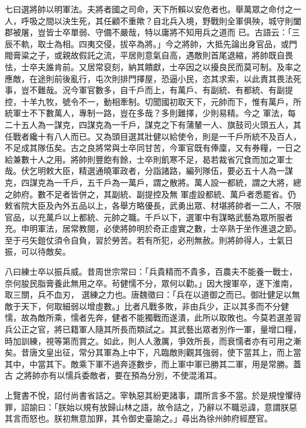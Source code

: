 \begin{pinyinscope}
 七曰選將帥以明軍法。夫將者國之司命，天下所賴以安危者也。舉萬眾之命付之一人，呼吸之間以決生死，其任顧不重歟？自北兵入境，野戰則全軍俱殃，城守則闔郡被屠，豈皆士卒單弱、守備不嚴哉，特以庸將不知用兵之道而
 已。古語云：「三辰不軌，取士為相。四夷交侵，拔卒為將。」今之將帥，大抵先論出身官品，或門閥膏粱之子，或親故假託之流，平居則意氣自高，遇敵則首尾退縮，將帥既自畏怯，士卒夫誰肯前。又居常裒刻，納其饋獻，士卒因之以擾良民而莫可制。及率之應敵，在途則前後亂行，屯次則排門擇屋，恐逼小民，恣其求索，以此責其畏法死事，豈不難哉。況今軍官數多，自千戶而上，有萬戶、有副統、有都統、有副提控，十羊九牧，號令不一，動相牽制。切聞國初取天下，元帥而下，惟有萬戶，所統軍士不下數萬人，專制一路，豈在多哉？多則難擇，少則易精。今之
 軍法，每二十五人為一謀克，四謀克為一千戶，謀克之下有蒲輦一人、旗鼓司火頭五人，其任戰者纔十有八人而已。又為頭目選其壯健以給使令，則是一千戶所統不及百人，不足成其隊伍矣。古之良將常與士卒同甘苦，今軍官既有俸廩，又有券糧，一日之給兼數十人之用。將帥則豐飽有餘，士卒則飢寒不足，曷若裁省冗食而加之軍士哉。伏乞明敕大臣，精選通曉軍政者，分詣諸路，編列隊伍，要必五十人為一謀克，四謀克為一千戶，五千戶為一萬戶，謂之散將。萬人設一都統，謂之大將，總之帥府。數不足者皆併之，其副統、副提控及無
 軍虛設都統、萬戶者悉罷省。仍敕省院大臣及內外五品以上，各舉方略優長，武勇出眾、材堪將帥者一二人，不限官品，以充萬戶以上都統、元帥之職。千戶以下，選軍中有謀略武藝為眾所服者充。申明軍法，居常教閱，必使將帥明於奇正虛實之數，士卒熟于坐作進退之節。至于弓矢鎧仗須令自負，習於勞苦。若有所犯，必刑無赦。則將帥得人，士氣日振，可以待敵矣。



 八曰練士卒以振兵威。昔周世宗常曰：「兵貴精而不貴多，百農夫不能養一戰士，奈何朘民脂膏養此無用之卒。茍健懦不分，眾何以勸。」因大搜軍卒，遂下淮南，取三關，兵不血刃，
 選練之力也。唐魏徵曰：「兵在以道御之而已。御壯健足以無敵于天下，何取細弱以增虛數。」比者凡戰多敗，非由兵少，正以其多而不分健懦，故為敵所乘，懦者先奔，健者不能獨戰而遂潰，此所以取敗也。今莫若選差習兵公正之官，將已籍軍人隨其所長而類試之。其武藝出眾者別作一軍，量增口糧，時加訓練，視等第而賞之。如此，則人人激厲，爭效所長，而衰懦者亦有可用之漸矣。昔唐文皇出征，常分其軍為上中下，凡臨敵則觀其強弱，使下當其上，而上當其中，中當其下。敵乘下軍不過奔逐數步，而上軍中軍已勝其二軍，用是常勝。蓋古
 之將帥亦有以懦兵委敵者，要在預為分別，不使混淆耳。



 上覽書不悅，詔付尚書省詰之。宰執惡其紛更諸事，謂所言多不當。於是規惶懼待罪，詔諭曰：「朕始以規有放歸山林之語，故令詰之，乃辭以不職忌諱，意謂朕惡其言而怒也。朕初無意加罪，其令御史臺諭之。」尋出為徐州帥府經歷官。




\end{pinyinscope}
